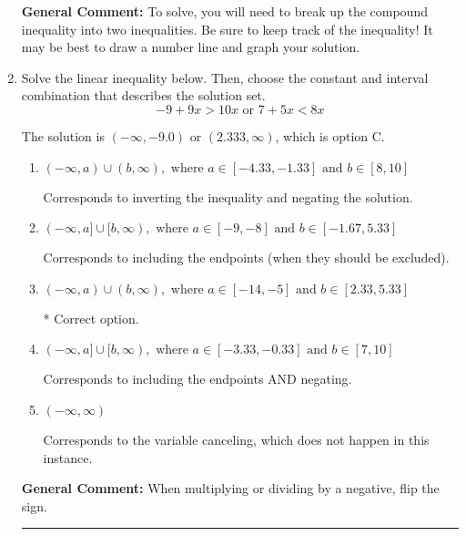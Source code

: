 \documentclass{extbook}[14pt]
\newcommand{\litem}[1]{\item #1

\rule{\textwidth}{0.4pt}}
\begin{document}
\begin{enumerate}
{\textbf{General Comment:} To solve, you will need to break up the compound inequality into two inequalities. Be sure to keep track of the inequality! It may be best to draw a number line and graph your solution.
}
\litem{
Solve the linear inequality below. Then, choose the constant and interval combination that describes the solution set.
\[ -9 + 9 x > 10 x \text{ or } 7 + 5 x < 8 x \]

The solution is \( (-\infty, -9.0) \text{ or } (2.333, \infty) \), which is option C.\begin{enumerate}[label=\Alph*.]
\item \( (-\infty, a) \cup (b, \infty), \text{ where } a \in [-4.33, -1.33] \text{ and } b \in [8, 10] \)

Corresponds to inverting the inequality and negating the solution.
\item \( (-\infty, a] \cup [b, \infty), \text{ where } a \in [-9, -8] \text{ and } b \in [-1.67, 5.33] \)

Corresponds to including the endpoints (when they should be excluded).
\item \( (-\infty, a) \cup (b, \infty), \text{ where } a \in [-14, -5] \text{ and } b \in [2.33, 5.33] \)

 * Correct option.
\item \( (-\infty, a] \cup [b, \infty), \text{ where } a \in [-3.33, -0.33] \text{ and } b \in [7, 10] \)

Corresponds to including the endpoints AND negating.
\item \( (-\infty, \infty) \)

Corresponds to the variable canceling, which does not happen in this instance.
\end{enumerate}

\textbf{General Comment:} When multiplying or dividing by a negative, flip the sign.
}
\end{enumerate}
\end{document}
